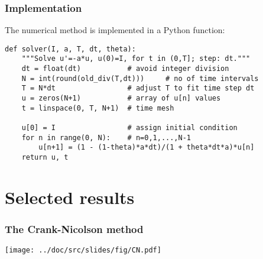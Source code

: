 \documentclass{beamer}
\begin{document}
\begin{frame}
\frametitle{Implementation}

The numerical method is implemented in a Python function:














\begin{verbatim}
def solver(I, a, T, dt, theta):
    """Solve u'=-a*u, u(0)=I, for t in (0,T]; step: dt."""
    dt = float(dt)           # avoid integer division
    N = int(round(old_div(T,dt)))     # no of time intervals
    T = N*dt                 # adjust T to fit time step dt
    u = zeros(N+1)           # array of u[n] values
    t = linspace(0, T, N+1)  # time mesh

    u[0] = I                 # assign initial condition
    for n in range(0, N):    # n=0,1,...,N-1
        u[n+1] = (1 - (1-theta)*a*dt)/(1 + theta*dt*a)*u[n]
    return u, t

\end{verbatim}
\end{frame}

\section[Results]{Selected results}

\begin{frame}
\frametitle{The Crank-Nicolson method}

\vspace{6mm}

\centerline{\texttt{[image: ../doc/src/slides/fig/CN.pdf]}}

\vspace{6mm}
\end{frame}
\end{document}

